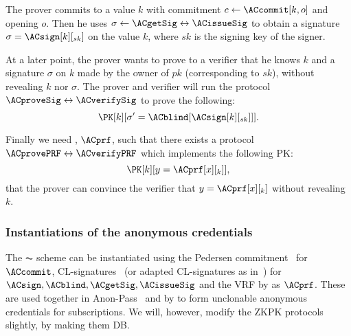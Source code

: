 The prover commits to a value \(k\) with commitment \(c\gets \ACcommit[k, o]\) 
and opening \(o\).
Then he uses \(\sigma\gets \ACgetSig\leftrightarrow \ACissueSig\) to obtain a 
signature \(\sigma = \ACsign[k][_{sk}]\) on the value \(k\), where \(sk\) is the 
signing key of the signer.

At a later point, the prover wants to prove to a verifier that he knows \(k\) 
and a signature \(\sigma\) on \(k\) made by the owner of \(pk\) (corresponding 
to \(sk\)), \ie without revealing \(k\) nor \(\sigma\).
The prover and verifier will run the protocol \(\ACproveSig\leftrightarrow 
  \ACverifySig\) to prove the following:
\begin{equation*}
  \PK[k][\sigma' = \ACblind[\ACsign[k][_{sk}]]].
\end{equation*}


Finally we need , \(\ACprf\), such that there exists a protocol 
\(\ACprovePRF\leftrightarrow \ACverifyPRF\) which implements the following 
\ac{PK}:
\begin{equation*}
  \PK[k][y = \ACprf[x][_k]],
\end{equation*}
\ie that the prover can convince the verifier that \(y = \ACprf[x][_k]\) 
without revealing \(k\).

{}


\subsubsection{Instantiations of the anonymous credentials} 

The \(\AC\) scheme can be instantiated using the Pedersen 
commitment~\cite{PedersenCommitment} for \(\ACcommit\),
CL-signatures~\cite{CLsignatures} (or adapted CL-signatures as 
in~\cite{AnonPass}) for \(\ACsign, \ACblind, \ACgetSig, \ACissueSig\) and
the \ac{VRF} by \citet{DY-VRF} as \(\ACprf\).
These are used together in \eg Anon-Pass~\cite{AnonPass} and by 
\citet{HowToWinTheCloneWars} to form unclonable anonymous credentials for 
subscriptions.
We will, however, modify the \ac{ZKPK} protocols slightly, by making them 
\acl{DB}.
